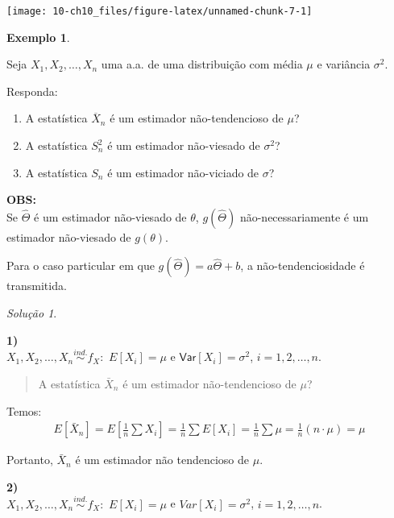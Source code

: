 \documentclass[
]{book}
\providecommand{\tightlist}{%
  \setlength{\itemsep}{0pt}\setlength{\parskip}{0pt}}
\theoremstyle{definition}
\theoremstyle{definition}
\newtheorem{example}{Exemplo}[chapter]
\theoremstyle{definition}
\theoremstyle{remark}
\newtheorem*{solution}{Solução}
\begin{document}
\texttt{[image: 10-ch10\_files/figure-latex/unnamed-chunk-7-1]}

\begin{example}
\protect\hypertarget{exm:unnamed-chunk-8}{}{\label{exm:unnamed-chunk-8} }
\end{example}

Seja \(X_1, X_2, \ldots, X_n\) uma a.a. de uma distribuição com média \(\mu\) e variância \(\sigma^2\).

Responda:

\begin{enumerate}
\def\labelenumi{\arabic{enumi})}
\tightlist
\item
  A estatística \(\overline{X}_n\) é um estimador não-tendencioso de \(\mu\)?\\
\item
  A estatística \(S_n^2\) é um estimador não-viesado de \(\sigma^2\)?\\
\item
  A estatística \(S_n\) é um estimador não-viciado de \(\sigma\)?
\end{enumerate}

\textbf{OBS:}\\
Se \(\hat{\Theta}\) é um estimador não-viesado de \(\theta\), \(g(\hat{\Theta})\) não-necessariamente é um estimador não-viesado de \(g(\theta)\).

Para o caso particular em que \(g(\hat{\Theta}) = a\hat{\Theta} + b\), a não-tendenciosidade é transmitida.

\begin{solution}
{}
\end{solution}

\textbf{1)}\\
\(X_1, X_2, \ldots, X_n \overset{ind.}{\sim} f_X:\) \(E[X_i] = \mu\) e \(\textsf{Var}[X_i] = \sigma^2\), \(i = 1, 2, \ldots, n\).

\begin{quote}
A estatística \(\bar{X}_n\) é um estimador não-tendencioso de \(\mu\)?
\end{quote}

Temos:
\begin{align*}
  E[\bar{X}_n] = E\left[\frac{1}{n}\sum X_i\right] = \frac{1}{n} \sum E[X_i] = \frac{1}{n} \sum \mu = \frac{1}{n} (n \cdot \mu) = \mu
\end{align*}

Portanto, \(\bar{X}_n\) é um estimador não tendencioso de \(\mu\).

\textbf{2)}\\
\(X_1, X_2, \ldots, X_n \overset{ind.}{\sim} f_X:\) \(E[X_i] = \mu\) e \(Var[X_i] = \sigma^2\), \(i = 1, 2, \ldots, n\).
\end{document}
